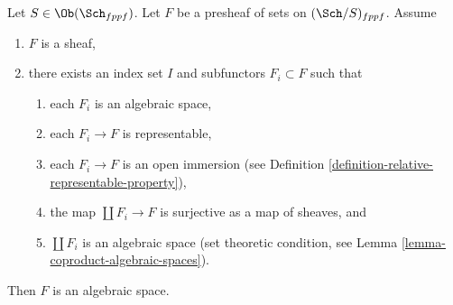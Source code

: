 \begin{lemma}
\label{lemma-glueing-algebraic-spaces}
Let $S \in \Ob(\Sch_{fppf})$.
Let $F$ be a presheaf of sets on $(\Sch/S)_{fppf}$.
Assume
\begin{enumerate}
\item $F$ is a sheaf,
\item there exists an index set $I$
and subfunctors $F_i \subset F$ such that
\begin{enumerate}
\item each $F_i$ is an algebraic space,
\item each $F_i \to F$ is representable,
\item each $F_i \to F$ is an open immersion (see
Definition \ref{definition-relative-representable-property}),
\item the map $\coprod F_i \to F$ is surjective as a map of sheaves, and
\item $\coprod F_i$ is an algebraic space (set theoretic condition, see
Lemma \ref{lemma-coproduct-algebraic-spaces}).
\end{enumerate}
\end{enumerate}
Then $F$ is an algebraic space.
\end{lemma}

